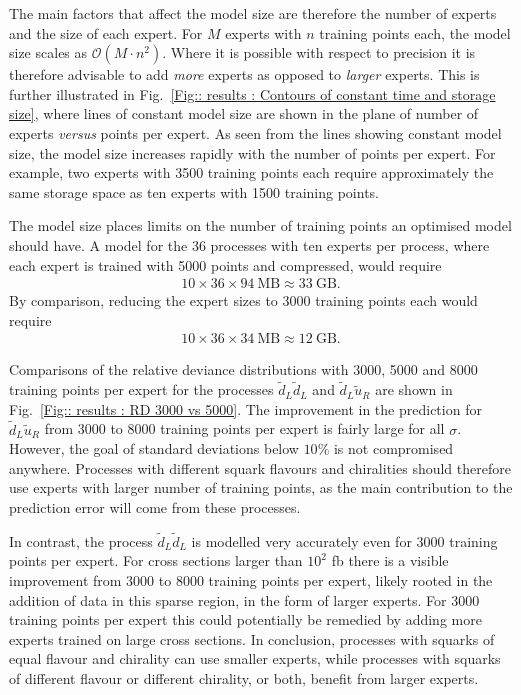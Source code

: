 \documentclass[twoside,english]{uiofysmaster}
\begin{document}
{{The main factors that affect the model size are therefore the number of experts and the size of each expert. For $M$ experts with $n$ training points each, the model size scales as $\mathcal{O}(M\cdot n^2)$. Where it is possible with respect to precision it is therefore advisable to add \textit{more} experts as opposed to \textit{larger} experts. This is further illustrated in Fig.~\ref{Fig:: results : Contours of constant time and storage size}, where lines of constant model size are shown in the plane of number of experts \textit{versus} points per expert. As seen from the lines showing constant model size, the model size increases rapidly with the number of points per expert. For example, two experts with 3500 training points each require approximately the same storage space as ten experts with 1500 training points.

The model size places limits on the number of training points an optimised model should have. A model for the 36 processes with ten experts per process, where each expert is trained with 5000 points and compressed, would require
\begin{align*}
10 \times 36 \times 94~\mathrm{MB} \approx 33~\mathrm{GB}. \nonumber
\end{align*}
By comparison, reducing the expert sizes to 3000 training points each would require
\begin{align}
10 \times 36 \times 34~\mathrm{MB} \approx 12~\mathrm{GB}. \nonumber
\end{align}


Comparisons of the relative deviance distributions with 3000, 5000 and 8000 training points per expert for the processes $\widetilde{d}_L \widetilde{d}_L$ and $\widetilde{d}_L \widetilde{u}_R$ are shown in Fig.~\ref{Fig:: results : RD 3000 vs 5000}. The improvement in the prediction for $\widetilde{d}_L \widetilde{u}_R$ from 3000 to 8000 training points per expert is fairly large for all $\sigma$. However, the goal of standard deviations below $10\%$ is not compromised anywhere. Processes with different squark flavours and chiralities should therefore use experts with larger number of training points, as the main contribution to the prediction error will come from these processes. 

In contrast, the process $\widetilde{d}_L \widetilde{d}_L$ is modelled very accurately even for 3000 training points per expert. For cross sections larger than $10^2$ fb there is a visible improvement from 3000 to 8000 training points per expert, likely rooted in the addition of data in this sparse region, in the form of larger experts. For 3000 training points per expert this could potentially be remedied by adding more experts trained on large cross sections. In conclusion, processes with squarks of equal flavour and chirality can use smaller experts, while processes with squarks of different flavour or different chirality, or both, benefit from larger experts.







}}
\end{document}
